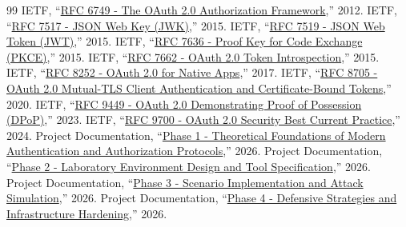 \documentclass[11pt,a4paper]{report}
\begin{document}
\begin{thebibliography}{99}
 IETF, ``\href{run:./References/rfc6749.html}{RFC 6749 - The OAuth 2.0 Authorization Framework},'' 2012.
 IETF, ``\href{run:./References/rfc7517.html}{RFC 7517 - JSON Web Key (JWK)},'' 2015.
 IETF, ``\href{run:./References/rfc7519.html}{RFC 7519 - JSON Web Token (JWT)},'' 2015.
 IETF, ``\href{run:./References/rfc7636.html}{RFC 7636 - Proof Key for Code Exchange (PKCE)},'' 2015.
 IETF, ``\href{run:./References/rfc7662.html}{RFC 7662 - OAuth 2.0 Token Introspection},'' 2015.
 IETF, ``\href{run:./References/rfc8252.html}{RFC 8252 - OAuth 2.0 for Native Apps},'' 2017.
 IETF, ``\href{run:./References/rfc8705.pdf}{RFC 8705 - OAuth 2.0 Mutual-TLS Client Authentication and Certificate-Bound Tokens},'' 2020.
 IETF, ``\href{run:./References/rfc9449.pdf}{RFC 9449 - OAuth 2.0 Demonstrating Proof of Possession (DPoP)},'' 2023.
 IETF, ``\href{run:./References/rfc9700.pdf}{RFC 9700 - OAuth 2.0 Security Best Current Practice},'' 2024.
 Project Documentation, ``\href{run:./References/Phase 1 Theoretical Foundations of Modern Authentication and Authorization Protocols.pdf}{Phase 1 - Theoretical Foundations of Modern Authentication and Authorization Protocols},'' 2026.
 Project Documentation, ``\href{run:./References/Phase 2 Laboratory Environment Design and Tool Specification.pdf}{Phase 2 - Laboratory Environment Design and Tool Specification},'' 2026.
 Project Documentation, ``\href{run:./References/Phase 3 Scenario Implementation and Attack Simulation.pdf}{Phase 3 - Scenario Implementation and Attack Simulation},'' 2026.
 Project Documentation, ``\href{run:./References/Phase 4 Defensive Strategies and Infrastructure Hardening.pdf}{Phase 4 - Defensive Strategies and Infrastructure Hardening},'' 2026.
\end{thebibliography}
\end{document}

